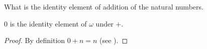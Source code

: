 

What is the identity element of addition of the natural numbers.


\begin{proposition}
  0 is the identity element of $\omega$ under $+$.
\end{proposition}
\begin{proof}
  By definition $0 + n = n$ (see ).
\end{proof}

\blankpage
